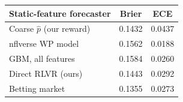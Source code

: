 \begin{tabular}{lcc}
\toprule
Static-feature forecaster & Brier & ECE \\
\midrule
Coarse $\hat{p}$ (our reward) & 0.1432 & 0.0437 \\
nflverse WP model & 0.1562 & 0.0188 \\
GBM, all features & 0.1584 & 0.0260 \\
\midrule
Direct RLVR (ours) & 0.1443 & 0.0292 \\
Betting market & 0.1355 & 0.0273 \\
\bottomrule
\end{tabular}
